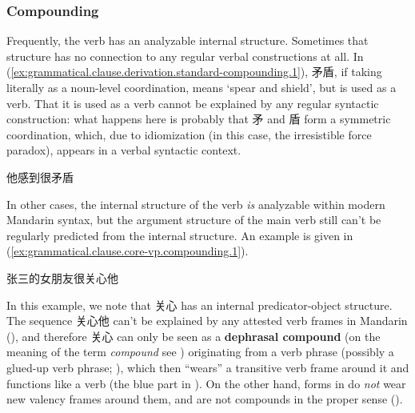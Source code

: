 \documentclass[UTF8, a4paper, oneside, scheme=plain, 12pt]{ctexrep}
\newcommand*{\concept}[1]{\textbf{#1}}
\newcommand*{\term}[1]{\emph{#1}}
\newcommand{\translate}[1]{`#1'}
\begin{document}
\subsubsection{Compounding}\label{sec:grammatical.clause.core-vp.derivation.compounding}

Frequently, the verb has an analyzable internal structure.
Sometimes that structure has no connection to any regular verbal constructions at all.
In (\ref{ex:grammatical.clause.derivation.standard-compounding.1}),
矛盾, if taking literally as a noun-level coordination, means \translate{spear and shield},
but is used as a verb.
That it is used as a verb cannot be explained by any regular syntactic construction:
what happens here is probably that 矛 and 盾 form a symmetric coordination,
which, due to idiomization (in this case, the irresistible force paradox),
appears in a verbal syntactic context.

\begin{exe}
    \ex\label{ex:grammatical.clause.derivation.standard-compounding.1} 他感到很矛盾
\end{exe}

In other cases, the internal structure of the verb \emph{is} analyzable within modern Mandarin syntax,
but the argument structure of the main verb still can't
be regularly predicted from the internal structure.
An example is given in (\ref{ex:grammatical.clause.core-vp.compounding.1}).

\begin{exe}
    \ex\label{ex:grammatical.clause.core-vp.compounding.1} 张三的女朋友很关心他
\end{exe}

In this example, we note that 关心 has an internal predicator-object structure.
The sequence 关心他 can't be explained by any attested verb frames in Mandarin
(),
and therefore 关心 can only be seen as a \concept{dephrasal compound}
(on the meaning of the term \term{compound} see )
originating from a verb phrase
(possibly a glued-up verb phrase; ),
which then ``wears'' a transitive verb frame around it and functions like a verb
(the blue part in ).
On the other hand, forms in 
do \emph{not} wear new valency frames around them,
and are not compounds in the proper sense (). 
\end{document}
